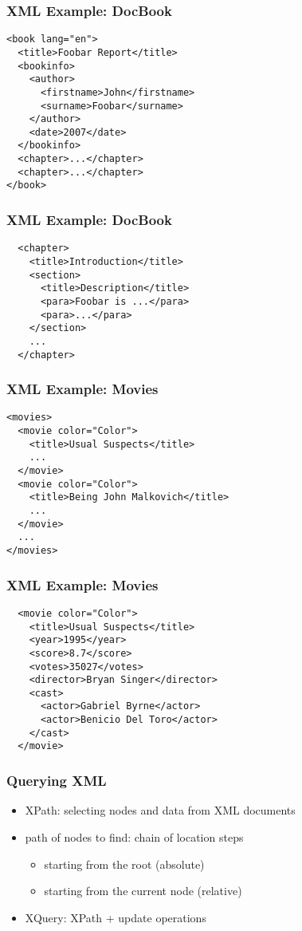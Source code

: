 \documentclass[dvipsnames]{beamer}
\theoremstyle{plain}
\begin{document}
\begin{frame}[fragile]
  \frametitle{XML Example: DocBook}

  \begin{lstlisting}
<book lang="en">
  <title>Foobar Report</title>
  <bookinfo>
    <author>
      <firstname>John</firstname>
      <surname>Foobar</surname>
    </author>
    <date>2007</date>
  </bookinfo>
  <chapter>...</chapter>
  <chapter>...</chapter>
</book>
  \end{lstlisting}
\end{frame}

\begin{frame}[fragile]
  \frametitle{XML Example: DocBook}

  \begin{lstlisting}
  <chapter>
    <title>Introduction</title>
    <section>
      <title>Description</title>
      <para>Foobar is ...</para>
      <para>...</para>
    </section>
    ...
  </chapter>
  \end{lstlisting}
\end{frame}

\begin{frame}[fragile]
  \frametitle{XML Example: Movies}

  \begin{lstlisting}
<movies>
  <movie color="Color">
    <title>Usual Suspects</title>
    ...
  </movie>
  <movie color="Color">
    <title>Being John Malkovich</title>
    ...
  </movie>
  ...
</movies>
  \end{lstlisting}
\end{frame}

\begin{frame}[fragile]
  \frametitle{XML Example: Movies}

  \begin{lstlisting}
  <movie color="Color">
    <title>Usual Suspects</title>
    <year>1995</year>
    <score>8.7</score>
    <votes>35027</votes>
    <director>Bryan Singer</director>
    <cast>
      <actor>Gabriel Byrne</actor>
      <actor>Benicio Del Toro</actor>
    </cast>
  </movie>
  \end{lstlisting}
\end{frame}

\begin{frame}
  \frametitle{Querying XML}

  \begin{itemize}
    \item XPath: selecting nodes and data from XML documents
    \item path of nodes to find: chain of location steps
    \begin{itemize}
      \item starting from the root (absolute)
      \item starting from the current node (relative)
    \end{itemize}

    \medskip
    \item XQuery: XPath + update operations
  \end{itemize}
\end{frame}
\end{document}
